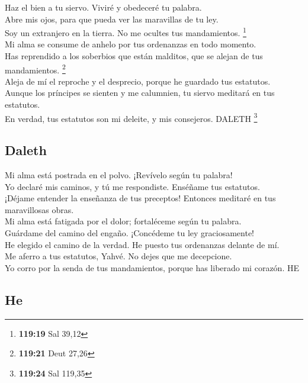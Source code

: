  Haz el bien a tu siervo. Viviré y obedeceré tu
palabra.\\
 Abre mis ojos, para que pueda ver las maravillas de tu
ley.\\
 Soy un extranjero en la tierra. No me ocultes tus
mandamientos. \footnote{\textbf{119:19} Sal 39,12}\\
 Mi alma se consume de anhelo por tus ordenanzas en todo
momento.\\
 Has reprendido a los soberbios que están malditos, que
se alejan de tus mandamientos. \footnote{\textbf{119:21} Deut 27,26}\\
 Aleja de mí el reproche y el desprecio, porque he
guardado tus estatutos.\\
 Aunque los príncipes se sienten y me calumnien, tu
siervo meditará en tus estatutos.\\
 En verdad, tus estatutos son mi deleite, y mis
consejeros. DALETH \footnote{\textbf{119:24} Sal 119,35}

\hypertarget{daleth}{%
\subsection{Daleth}\label{daleth}}

 Mi alma está postrada en el polvo. ¡Revívelo según tu
palabra!\\
 Yo declaré mis caminos, y tú me respondiste. Enséñame
tus estatutos.\\
 ¡Déjame entender la enseñanza de tus preceptos! Entonces
meditaré en tus maravillosas obras.\\
 Mi alma está fatigada por el dolor; fortaléceme según tu
palabra.\\
 Guárdame del camino del engaño. ¡Concédeme tu ley
graciosamente!\\
 He elegido el camino de la verdad. He puesto tus
ordenanzas delante de mí.\\
 Me aferro a tus estatutos, Yahvé. No dejes que me
decepcione.\\
 Yo corro por la senda de tus mandamientos, porque has
liberado mi corazón. HE

\hypertarget{he}{%
\subsection{He}\label{he}}

